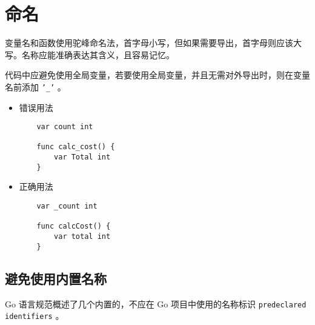 \chapter{命名}
变量名和函数使用驼峰命名法，首字母小写，但如果需要导出，首字母则应该大写。名称应能准确表达其含义，且容易记忆。

代码中应避免使用全局变量，若要使用全局变量，并且无需对外导出时，则在变量名前添加 \texttt{'\_'} 。

\begin{itemize}[leftmargin=4em]
\item 错误用法

  \begin{verbatim}
    var count int

    func calc_cost() {
    	var Total int
    }
  \end{verbatim}
\item 正确用法

  \begin{verbatim}
    var _count int

    func calcCost() {
    	var total int
    }
  \end{verbatim}
\end{itemize}

\section{避免使用内置名称}
Go 语言规范概述了几个内置的，不应在 Go 项目中使用的名称标识 \texttt{predeclared identifiers} 。

